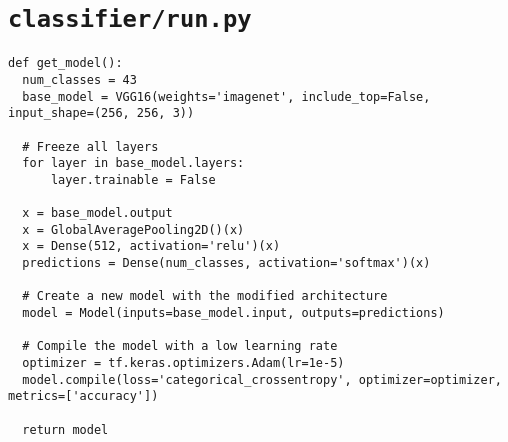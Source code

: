 \section*{\lstinline{classifier/run.py}}

\begin{code}
\begin{verbatim}
def get_model():
  num_classes = 43
  base_model = VGG16(weights='imagenet', include_top=False, input_shape=(256, 256, 3))

  # Freeze all layers
  for layer in base_model.layers:
      layer.trainable = False

  x = base_model.output
  x = GlobalAveragePooling2D()(x)
  x = Dense(512, activation='relu')(x)
  predictions = Dense(num_classes, activation='softmax')(x)

  # Create a new model with the modified architecture
  model = Model(inputs=base_model.input, outputs=predictions)

  # Compile the model with a low learning rate
  optimizer = tf.keras.optimizers.Adam(lr=1e-5)
  model.compile(loss='categorical_crossentropy', optimizer=optimizer, metrics=['accuracy'])

  return model
\end{verbatim}
\label{lst:vgg16}
\end{code}


